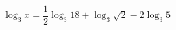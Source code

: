 \begin{ex}[type=equation]
	\begin{condition}
		$\log_3 x = \dfrac{1}{2}\log_3 18 + \log_3\sqrt{2} - 2\log_3 5$
	\end{condition}
\end{ex}